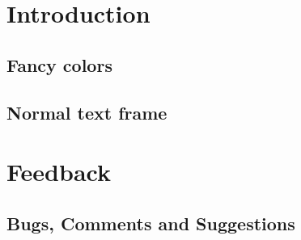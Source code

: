 \documentclass[10pt]{beamer}
\begin{document}
    \maketitleframe
    
    
    \section{Introduction}
        \subsection{Fancy colors}
            
        \subsection{Normal text frame}
            
            
    
    \section{Feedback}
        \subsection{Bugs, Comments and Suggestions}
            
    
    \makefinalframe
\end{document}

